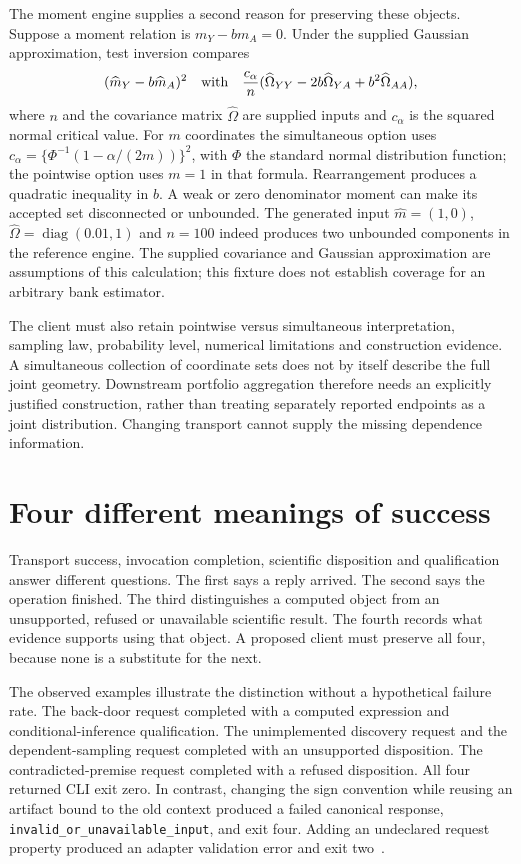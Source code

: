 The moment engine supplies a second reason for preserving these objects.
Suppose a moment relation is $m_Y-bm_A=0$. Under the supplied Gaussian
approximation, test inversion compares
\[
 (\widehat m_Y-b\widehat m_A)^2
 \quad\hbox{with}\quad
 \frac{c_\alpha}{n}
 (\widehat\Omega_{YY}-2b\widehat\Omega_{YA}
                      +b^2\widehat\Omega_{AA}),
\]
where $n$ and the covariance matrix $\widehat\Omega$ are supplied inputs and
$c_\alpha$ is the squared normal critical value. For $m$ coordinates the
simultaneous option uses $c_\alpha=\{\Phi^{-1}(1-\alpha/(2m))\}^2$,
with $\Phi$ the standard normal distribution function; the pointwise option
uses $m=1$ in that formula. Rearrangement produces a quadratic
inequality in $b$. A weak or zero denominator moment can make its accepted
set disconnected or unbounded. The generated input
$\widehat m=(1,0)$, $\widehat\Omega=\operatorname{diag}(0.01,1)$ and $n=100$
indeed produces two unbounded components in the reference engine. The
supplied covariance and Gaussian approximation are assumptions of this
calculation; this fixture does not establish coverage for an arbitrary bank
estimator.

The client must also retain pointwise versus simultaneous interpretation,
sampling law, probability level, numerical limitations and construction
evidence. A simultaneous collection of coordinate sets does not by itself
describe the full joint geometry. Downstream portfolio aggregation therefore
needs an explicitly justified construction, rather than treating separately
reported endpoints as a joint distribution. Changing transport cannot supply
the missing dependence information.

\section{Four different meanings of success}

Transport success, invocation completion, scientific disposition and
qualification answer different questions. The first says a reply arrived.
The second says the operation finished. The third distinguishes a computed
object from an unsupported, refused or unavailable scientific result. The
fourth records what evidence supports using that object. A proposed client
must preserve all four, because none is a substitute for the next.

The observed examples illustrate the distinction without a hypothetical
failure rate. The back-door request completed with a computed expression and
conditional-inference qualification. The unimplemented discovery request and
the dependent-sampling request completed with an unsupported disposition.
The contradicted-premise request completed with a refused disposition. All
four returned CLI exit zero. In contrast, changing the sign convention while
reusing an artifact bound to the old context produced a failed canonical
response, \texttt{invalid\_or\_unavailable\_input}, and exit four. Adding an
undeclared request property produced an adapter validation error and exit
two~\citep{exec13_i2_examples}.

